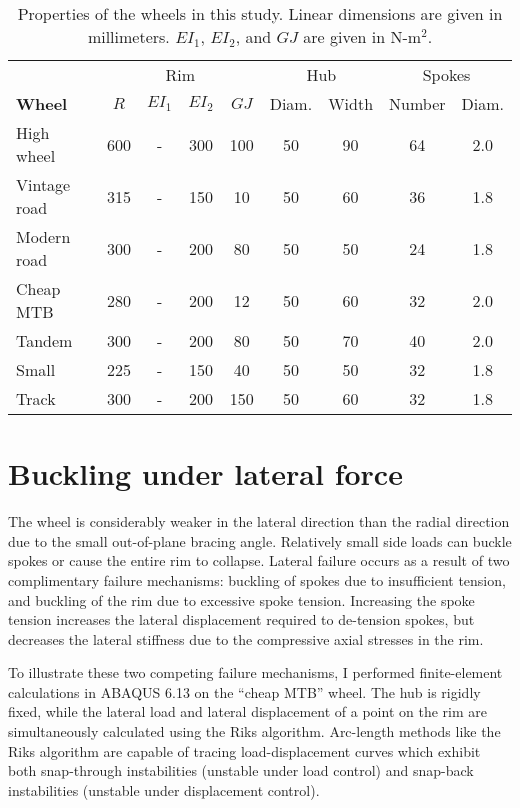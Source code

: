 \documentclass[\rootdir/thesis.tex]{subfiles}
\begin{document}
\begin{table}
\caption{Properties of the wheels in this study. Linear dimensions are given in millimeters. $EI_1$, $EI_2$, and $GJ$ are given in N-m$^2$.}
\label{tab:buckling_ext_wheel_props}
\begin{tabular}{l|cccc|cc|cc}
\hline
&\multicolumn{4}{c|}{Rim} & \multicolumn{2}{c|}{Hub} & \multicolumn{2}{c}{Spokes}\\
\bf{Wheel} & $R$ & $EI_1$ & $EI_2$ & $GJ$ & Diam. & Width & Number & Diam.\\
\hline
High wheel   & 600 & - & 300 & 100 & 50 & 90 & 64 & 2.0\\
Vintage road & 315 & - & 150 & 10  & 50 & 60 & 36 & 1.8\\
Modern road  & 300 & - & 200 & 80  & 50 & 50 & 24 & 1.8\\
Cheap MTB    & 280 & - & 200 & 12  & 50 & 60 & 32 & 2.0\\
Tandem       & 300 & - & 200 & 80  & 50 & 70 & 40 & 2.0\\
Small        & 225 & - & 150 & 40  & 50 & 50 & 32 & 1.8\\
Track        & 300 & - & 200 & 150 & 50 & 60 & 32 & 1.8\\
\hline
\end{tabular}
\end{table}


\section{Buckling under lateral force}

The wheel is considerably weaker in the lateral direction than the radial direction due to the small out-of-plane bracing angle. Relatively small side loads can buckle spokes or cause the entire rim to collapse. Lateral failure occurs as a result of two complimentary failure mechanisms: buckling of spokes due to insufficient tension, and buckling of the rim due to excessive spoke tension. Increasing the spoke tension increases the lateral displacement required to de-tension spokes, but decreases the lateral stiffness due to the compressive axial stresses in the rim.

To illustrate these two competing failure mechanisms, I performed finite-element calculations in ABAQUS 6.13 on the ``cheap MTB'' wheel. The hub is rigidly fixed, while the lateral load and lateral displacement of a point on the rim are simultaneously calculated using the Riks algorithm. Arc-length methods like the Riks algorithm are capable of tracing load-displacement curves which exhibit both snap-through instabilities (unstable under load control) and snap-back instabilities (unstable under displacement control).
\end{document}
